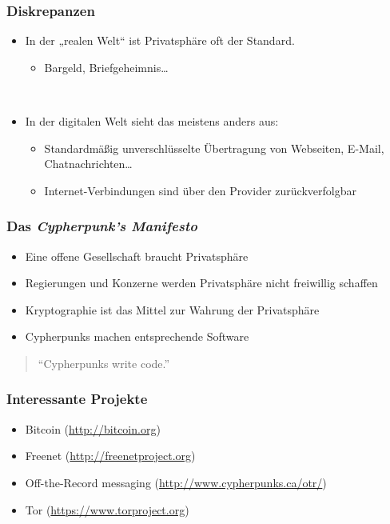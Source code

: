 \documentclass{beamer}
\begin{document}
\begin{frame}
\frametitle{Diskrepanzen}

	\begin{itemize}
		\item In der „realen Welt“ ist Privatsphäre oft der Standard.
		\begin{itemize}
			\item Bargeld, Briefgeheimnis…
		\end{itemize}
	
		\ \\
	
		\item In der digitalen Welt sieht das meistens anders aus:
		\begin{itemize}
			\item Standardmäßig unverschlüsselte Übertragung von Webseiten, E-Mail, Chatnachrichten\dots
			\item Internet-Verbindungen sind über den Provider zurückverfolgbar
		\end{itemize}
	\end{itemize}
\end{frame}

\begin{frame}
\frametitle{Das \textit{Cypherpunk’s Manifesto}}

	\begin{itemize}
		\item Eine offene Gesellschaft braucht Privatsphäre
		\item Regierungen und Konzerne werden Privatsphäre nicht freiwillig schaffen
		\item Kryptographie ist das Mittel zur Wahrung der Privatsphäre
		\item Cypherpunks machen entsprechende Software
	\end{itemize}

	\begin{quote}
		“Cypherpunks write code.”
	\end{quote}
\end{frame}

\begin{frame}
\frametitle{Interessante Projekte}

	\begin{itemize}
		\item Bitcoin (\url{http://bitcoin.org})
		\item Freenet (\url{http://freenetproject.org})
		\item Off-the-Record messaging (\url{http://www.cypherpunks.ca/otr/})
		\item Tor (\url{https://www.torproject.org})
	\end{itemize}
\end{frame}
\end{document}
